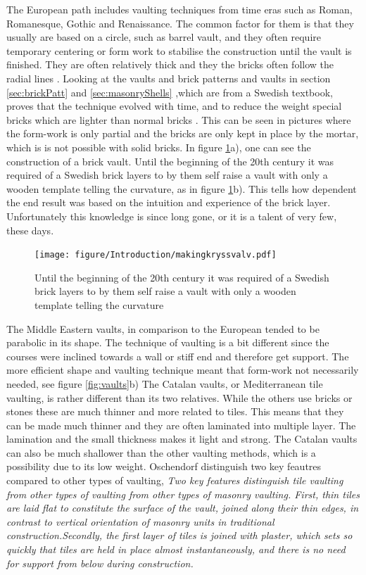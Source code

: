 The European path includes vaulting techniques from time eras such as Roman, Romanesque, Gothic and Renaissance. The common factor for them is that they usually are based on a circle, such as barrel vault, and they often require temporary centering or form work to stabilise the construction until the vault is finished. They are often relatively thick and they the bricks often follow the radial lines \cite{ref:Dieste}. Looking at the vaults and brick patterns and vaults in section \ref{sec:brickPatt} and \ref{sec:masonryShells} ,which are from a Swedish textbook, proves that the technique evolved with time, and to reduce the weight special bricks which are lighter than normal bricks \cite{ref:murning}. This can be seen in pictures where the form-work is only partial and the bricks are only kept in place by the mortar, which is is not possible with solid bricks. In figure \ref{fig:kryssvalv}a),  one can see the construction of a brick vault. Until the beginning of the 20th century it was required of a Swedish brick layers to by them self raise a vault with only a wooden template telling the curvature\cite{ref:murning}, as in figure \ref{fig:kryssvalv}b). This tells how dependent the end result was based on the intuition and experience of the brick layer. Unfortunately this knowledge is since long gone, or it is a talent of very few, these days.

\begin{figure}[H]
\centering
\texttt{[image: figure/Introduction/makingkryssvalv.pdf]}
\caption{Until the beginning of the 20th century it was required of a Swedish brick layers to by them self raise a vault with only a wooden template telling the curvature\cite{ref:murning}}
\label{fig:kryssvalv}
\end{figure}

The Middle Eastern vaults, in comparison to the European tended to be parabolic in its shape. The technique of vaulting is a bit different since the courses were inclined towards a wall or stiff end and therefore get support. The more efficient shape and vaulting technique meant that form-work not necessarily needed\cite{ref:Dieste}, see figure \ref{fig:vaults}b)
The Catalan vaults, or Mediterranean tile vaulting, is rather different than its two relatives. While the others use bricks or stones these are much thinner and more related to tiles. This means that they can be made much thinner and they are often laminated into multiple layer. The lamination and the small thickness makes it light and strong\cite{ref:Dieste}. The Catalan vaults can also be much shallower than the other vaulting methods, which is a possibility due to its low weight. Oschendorf distinguish two key feautres compared to other types of vaulting, \textit{ Two key features distinguish tile vaulting from other types of vaulting from other types of masonry vaulting. First, thin tiles are laid flat to constitute the surface of the vault, joined along their thin edges, in contrast to vertical orientation of masonry units in traditional construction.Secondly, the first layer of tiles is joined with plaster, which sets so quickly that tiles are held in place almost instantaneously, and there is no need for support from below during construction.}\cite{ref:Ochsendorf}
\vspace{5mm}

